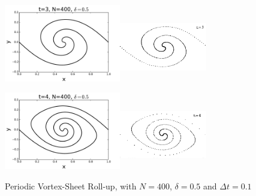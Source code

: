 \documentclass[12pt,twoside]{article}
\begin{document}
\begin{figure}
\begin{center}
	\includegraphics[width=2in,height=1.33in]{K4.pdf}\includegraphics[width=1.5in,height=1.2in]{periodic4.png}
	
	\includegraphics[width=2in,height=1.33in]{K5.pdf}\includegraphics[width=1.5in,height=1.2in]{periodic5.png}
\end{center}
\caption{Periodic Vortex-Sheet Roll-up, with $N=400$, $\delta=0.5$ and $\Delta t=0.1$}
\label{sw2}
\end{figure}
\end{document}
